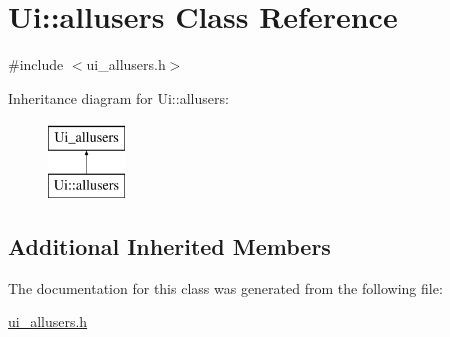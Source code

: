 \hypertarget{classUi_1_1allusers}{\section{Ui\-:\-:allusers Class Reference}
\label{classUi_1_1allusers}
}


{\ttfamily \#include $<$ui\-\_\-allusers.\-h$>$}

Inheritance diagram for Ui\-:\-:allusers\-:\begin{figure}[H]
\begin{center}
\leavevmode
\includegraphics[height=2.000000cm]{classUi_1_1allusers}
\end{center}
\end{figure}
\subsection*{Additional Inherited Members}


The documentation for this class was generated from the following file\-:\begin{DoxyCompactItemize}
\item 
\hyperlink{ui__allusers_8h}{ui\-\_\-allusers.\-h}\end{DoxyCompactItemize}
